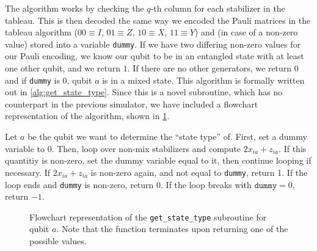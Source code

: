 The algorithm works by checking the $q$-th column for
each stabilizer in the tableau. This is then decoded the same way we encoded
the Pauli matrices in the tableau algorithm ($00 \equiv I$, $01\equiv Z$, $10
\equiv X$, $11 \equiv Y$) and (in case of a non-zero value) stored into a
variable \texttt{dummy}. If we have two differing non-zero values for our Pauli
encoding, we know our qubit to be in an entangled state with at least one other
qubit, and we return $1$. If there are no other generators, we return $0$ and
if \texttt{dummy} is $0$, qubit $a$ is in a mixed state. This algorithm is
formally written out in \cref{alg:get_state_type}. Since this is a novel
subroutine, which has no counterpart in the previous simulator, we have
included a flowchart representation of the algorithm, shown in
\cref{fig:statetype-diag}.
%

\begin{alg}\label{alg:get_state_type}
  Let $a$ be the qubit we want to determine the \enquote{state type} of. First,
  set a dummy variable to $0$. Then, loop over non-mix stabilizers and compute
  $2x_{ia} + z_{ia}$. If this quantitiy is non-zero, set the dummy variable
  equal to it, then continue looping if necessary. If $2x_{ia}+z_{ia}$ is
  non-zero again, and not equal to \verb|dummy|, return 1. If the loop ends and
  \verb|dummy| is non-zero, return 0. If the loop breaks with
  $\texttt{dummy}=0$, return $-1$.
\end{alg}

\begin{figure}[p]
  \centering
  
  \caption{Flowchart representation of the \texttt{get\_state\_type} subroutine
  for qubit $a$. Note that the function terminates upon returning one of the
possible values. }
  \label{fig:statetype-diag}
\end{figure}

%
